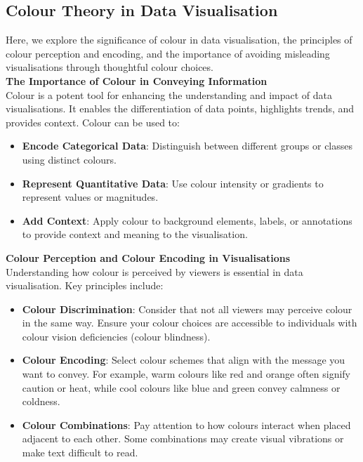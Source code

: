 \documentclass{article}\usepackage[]{graphicx}\usepackage[]{xcolor}
\begin{document}
\subsection{Colour Theory in Data Visualisation}
Here, we explore the significance of colour in data visualisation, the principles of colour perception and encoding, and the importance of avoiding misleading visualisations through thoughtful colour choices.\\

\textbf{The Importance of Colour in Conveying Information}\\
Colour is a potent tool for enhancing the understanding and impact of data visualisations. It enables the differentiation of data points, highlights trends, and provides context. Colour can be used to:
\begin{itemize}
    \item \textbf{Encode Categorical Data}: Distinguish between different groups or classes using distinct colours.
    \item \textbf{Represent Quantitative Data}: Use colour intensity or gradients to represent values or magnitudes.
    \item \textbf{Add Context}: Apply colour to background elements, labels, or annotations to provide context and meaning to the visualisation.
\end{itemize}

\textbf{Colour Perception and Colour Encoding in Visualisations}\\
Understanding how colour is perceived by viewers is essential in data visualisation. Key principles include:
\begin{itemize}
    \item \textbf{Colour Discrimination}: Consider that not all viewers may perceive colour in the same way. Ensure your colour choices are accessible to individuals with colour vision deficiencies (colour blindness).
    \item \textbf{Colour Encoding}: Select colour schemes that align with the message you want to convey. For example, warm colours like red and orange often signify caution or heat, while cool colours like blue and green convey calmness or coldness.
    \item \textbf{Colour Combinations}: Pay attention to how colours interact when placed adjacent to each other. Some combinations may create visual vibrations or make text difficult to read.
\end{itemize}
\end{document}
